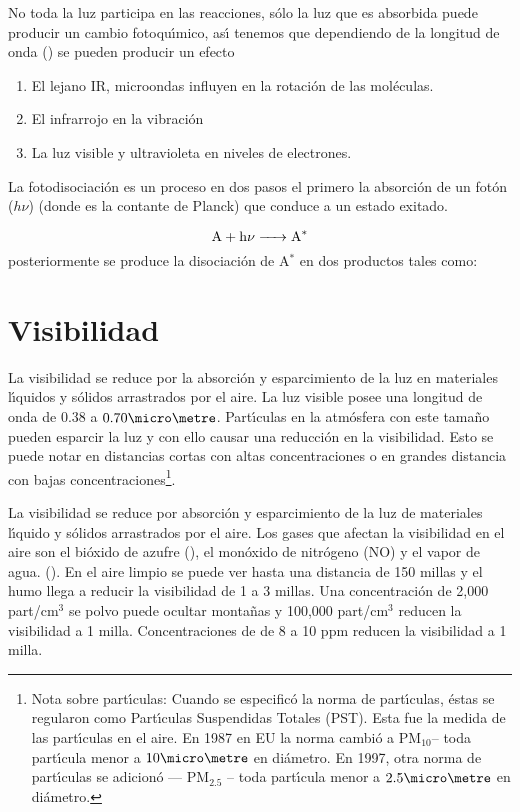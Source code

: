 No toda la luz participa en las reacciones, s\'olo la luz que es absorbida puede producir un cambio fotoqu\'{\i}mico, as\'{\i} tenemos que dependiendo de la longitud de onda () se pueden producir un efecto
\begin{enumerate}
\item El lejano IR, microondas influyen en la rotaci\'on de las mol\'eculas.
\item El infrarrojo en la vibraci\'on
\item La luz visible y ultravioleta en niveles de electrones.
\end{enumerate}

La fotodisociaci\'on es un proceso en dos pasos el primero la absorci\'on de un fot\'on ($h\nu$) (donde    es la contante de Planck) que conduce a un estado exitado.

 \begin{equation*}
\ce{A + h{\nu}    -> A^* } \end{equation*}
posteriormente se produce la disociaci\'on de A$^*$ en dos productos tales como:
 

\section{Visibilidad}

La visibilidad se reduce por la absorci\'on y esparcimiento de la luz en materiales l\'{\i}quidos y s\'olidos arrastrados por el aire. La luz visible posee una longitud de onda de $0.38$ a  $0.70\micro\metre$. Part\'{\i}culas en la atm\'osfera con este tama\~no pueden esparcir la luz y con ello causar una reducci\'on en la visibilidad. Esto se puede notar en distancias cortas con altas concentraciones o en grandes distancia con bajas concentraciones\footnote{Nota sobre  part\'{\i}culas:  Cuando se especific\'o la norma de part\'{\i}culas, \'estas se regularon como Part\'{\i}culas Suspendidas Totales (PST). Esta fue la medida de las part\'{\i}culas  en el aire. 
En 1987 en EU la norma cambi\'o a PM$_{10} $-- toda part\'{\i}cula menor a $10\micro\metre$  en di\'ametro.
En 1997, otra norma de  part\'{\i}culas se adicion\'o --- PM$_{2.5}$ -- toda  part\'{\i}cula menor a $2.5\micro\metre$ en di\'ametro.}.

La visibilidad se reduce por absorci\'on y esparcimiento de la luz de  materiales l\'{\i}quido y s\'olidos arrastrados por el aire. Los gases que afectan la visibilidad en el aire son el bi\'oxido de azufre (), el mon\'oxido de nitr\'ogeno (NO) y el vapor de agua. (). En el aire limpio se puede ver hasta una distancia de 150 millas y el humo llega a reducir la visibilidad de 1 a 3 millas. Una concentraci\'on de 2,000 part/cm$^3$ se polvo puede ocultar monta\~nas y 100,000 part/cm$^3$ reducen la visibilidad a 1 milla. Concentraciones de  de 8 a 10 ppm reducen la visibilidad a 1 milla.

